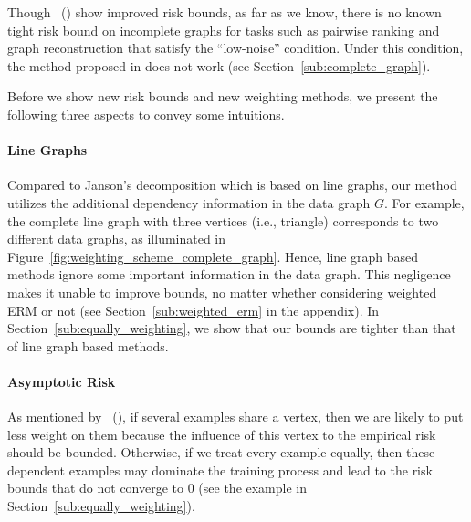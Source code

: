\documentclass[letterpaper]{article} %
\newcommand{\problemabbr}{\textnormal{C}\textsc{lanet}}
\newcommand{\citet}[1]{\citeauthor{#1}\ (\citeyear{#1})}
\newcommand{\citep}[3]{(#1\ \citeauthor{#3}\ \citeyear{#3},\ #2)}
\begin{document}
Though \citet{wang2017learning} show improved risk bounds, as far as we know, there is no known tight risk bound on incomplete graphs for tasks such as pairwise ranking and graph reconstruction that satisfy the ``low-noise'' condition. Under this condition, the method proposed in \cite{wang2017learning} does not work (see Section~\ref{sub:complete_graph}). 



Before we show new risk bounds and new weighting methods, we present the following three aspects to convey some intuitions. 

\paragraph{Line Graphs} 
Compared to Janson's decomposition which is based on line graphs, our method utilizes the additional dependency information in the data graph $G$. 
For example, the complete line graph with three vertices (i.e., triangle) corresponds to two different data graphs, as illuminated in Figure~\ref{fig:weighting_scheme_complete_graph}. 
Hence, line graph based methods ignore some important information in the data graph. 
This negligence makes it unable to improve bounds, no matter whether considering weighted ERM or not (see Section~\ref{sub:weighted_erm} in the appendix). 
In Section~\ref{sub:equally_weighting}, we show that our bounds are tighter than that of line graph based methods. 

\paragraph{Asymptotic Risk}
As mentioned by \citet{wang2017learning}, if several examples share a vertex, then we are likely to put less weight on them because the influence of this vertex to the empirical risk should be bounded. 
Otherwise, if we treat every example equally, then these dependent examples may dominate the training process and lead to the risk bounds that do not converge to $0$ (see the example in Section~\ref{sub:equally_weighting}).
\end{document}

